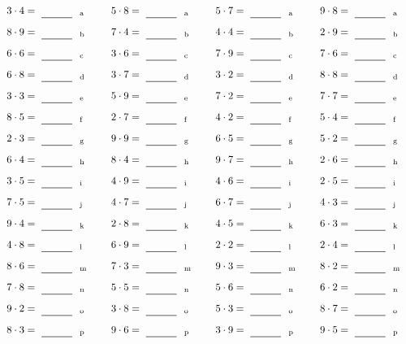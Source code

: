 \documentclass
[
  draft    = true,
  fontsize = 11pt,
  parskip  = half-
]
{scrartcl}
\begin{document}
\par\vfill\par
\begin{align*}
    \pline{3\cdot4}&=\rline{a}
  & \pline{5\cdot8}&=\rline{a}
  & \pline{5\cdot7}&=\rline{a}
  & \pline{9\cdot8}&=\rline{a} \\[1ex]
    \pline{8\cdot9}&=\rline{b}
  & \pline{7\cdot4}&=\rline{b}
  & \pline{4\cdot4}&=\rline{b}
  & \pline{2\cdot9}&=\rline{b} \\[1ex]
    \pline{6\cdot6}&=\rline{c}
  & \pline{3\cdot6}&=\rline{c}
  & \pline{7\cdot9}&=\rline{c}
  & \pline{7\cdot6}&=\rline{c} \\[1ex]
    \pline{6\cdot8}&=\rline{d}
  & \pline{3\cdot7}&=\rline{d}
  & \pline{3\cdot2}&=\rline{d}
  & \pline{8\cdot8}&=\rline{d} \\[1ex]
    \pline{3\cdot3}&=\rline{e}
  & \pline{5\cdot9}&=\rline{e}
  & \pline{7\cdot2}&=\rline{e}
  & \pline{7\cdot7}&=\rline{e} \\[1ex]
    \pline{8\cdot5}&=\rline{f}
  & \pline{2\cdot7}&=\rline{f}
  & \pline{4\cdot2}&=\rline{f}
  & \pline{5\cdot4}&=\rline{f} \\[1ex]
    \pline{2\cdot3}&=\rline{g}
  & \pline{9\cdot9}&=\rline{g}
  & \pline{6\cdot5}&=\rline{g}
  & \pline{5\cdot2}&=\rline{g} \\[1ex]
    \pline{6\cdot4}&=\rline{h}
  & \pline{8\cdot4}&=\rline{h}
  & \pline{9\cdot7}&=\rline{h}
  & \pline{2\cdot6}&=\rline{h} \\[1ex]
    \pline{3\cdot5}&=\rline{i}
  & \pline{4\cdot9}&=\rline{i}
  & \pline{4\cdot6}&=\rline{i}
  & \pline{2\cdot5}&=\rline{i} \\[1ex]
    \pline{7\cdot5}&=\rline{j}
  & \pline{4\cdot7}&=\rline{j}
  & \pline{6\cdot7}&=\rline{j}
  & \pline{4\cdot3}&=\rline{j} \\[1ex]
    \pline{9\cdot4}&=\rline{k}
  & \pline{2\cdot8}&=\rline{k}
  & \pline{4\cdot5}&=\rline{k}
  & \pline{6\cdot3}&=\rline{k} \\[1ex]
    \pline{4\cdot8}&=\rline{l}
  & \pline{6\cdot9}&=\rline{l}
  & \pline{2\cdot2}&=\rline{l}
  & \pline{2\cdot4}&=\rline{l} \\[1ex]
    \pline{8\cdot6}&=\rline{m}
  & \pline{7\cdot3}&=\rline{m}
  & \pline{9\cdot3}&=\rline{m}
  & \pline{8\cdot2}&=\rline{m} \\[1ex]
    \pline{7\cdot8}&=\rline{n}
  & \pline{5\cdot5}&=\rline{n}
  & \pline{5\cdot6}&=\rline{n}
  & \pline{6\cdot2}&=\rline{n} \\[1ex]
    \pline{9\cdot2}&=\rline{o}
  & \pline{3\cdot8}&=\rline{o}
  & \pline{5\cdot3}&=\rline{o}
  & \pline{8\cdot7}&=\rline{o} \\[1ex]
    \pline{8\cdot3}&=\rline{p}
  & \pline{9\cdot6}&=\rline{p}
  & \pline{3\cdot9}&=\rline{p}
  & \pline{9\cdot5}&=\rline{p}
\end{align*}
\end{document}
